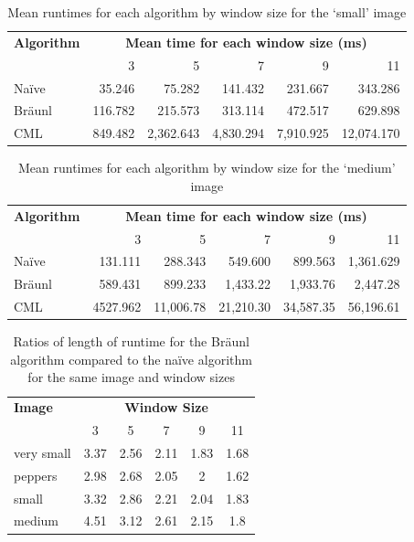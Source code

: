 \begin{table}
\centering
\caption{Mean runtimes for each algorithm by window size for the `small' image}
\label{tab:median:small}
\begin{tabular}{@{}lrrrrr@{}}
\toprule
\multicolumn{1}{c}{\textbf{Algorithm}} & \multicolumn{5}{c}{\textbf{Mean time for each window size (ms)}}  \\
                              & 3       & 5         & 7         & 9         & 11         \\ \midrule
Naïve                         & 35.246  & 75.282    & 141.432   & 231.667   & 343.286    \\
Bräunl                        & 116.782 & 215.573   & 313.114   & 472.517   & 629.898    \\
CML                           & 849.482 & 2,362.643 & 4,830.294 & 7,910.925 & 12,074.170 \\ \bottomrule
\end{tabular}
\end{table}

\begin{table}
\centering
\caption{Mean runtimes for each algorithm by window size for the `medium' image}
\label{tab:median:medium}
\begin{tabular}{@{}lrrrrr@{}}
\toprule
\multicolumn{1}{c}{\textbf{Algorithm}} & \multicolumn{5}{c}{\textbf{Mean time for each window size (ms)}}      \\
\multicolumn{1}{r}{}                   & \multicolumn{1}{r}{3} & 5         & 7         & 9         & 11        \\ \midrule
Naïve                                  & 131.111               & 288.343   & 549.600   & 899.563   & 1,361.629 \\
Bräunl                                 & 589.431
               & 899.233   & 1,433.22  & 1,933.76  & 2,447.28  \\
CML                                    & 4527.962
               & 11,006.78 & 21,210.30 & 34,587.35 & 56,196.61 \\ \bottomrule
\end{tabular}
\end{table}

\begin{table}
\centering
\caption{Ratios of length of runtime for the Bräunl algorithm compared to the naïve algorithm for the same image and window sizes}
\label{tab:median:ratbraun}
\begin{tabular}{@{}lccccc@{}}
\toprule
\textbf{Image} & \multicolumn{5}{c}{\textbf{Window Size}} \\
               & 3      & 5      & 7      & 9     & 11    \\ \midrule
very small     & 3.37   & 2.56   & 2.11   & 1.83  & 1.68  \\
peppers        & 2.98   & 2.68   & 2.05   & 2     & 1.62  \\
small          & 3.32   & 2.86   & 2.21   & 2.04  & 1.83  \\
medium         & 4.51   & 3.12   & 2.61   & 2.15  & 1.8   \\ \bottomrule
\end{tabular}
\end{table}

